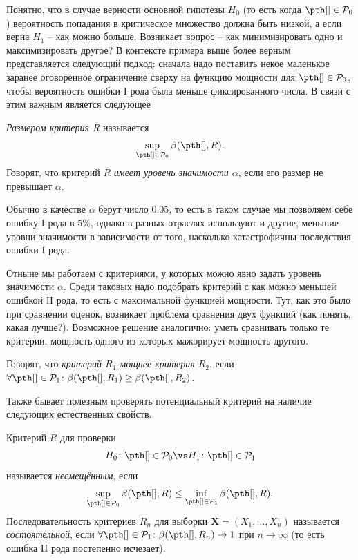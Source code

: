Понятно, что в случае верности основной гипотезы $H_0$ (то есть когда $\pth[] \in \mathcal{P}_0$) вероятность попадания в критическое множество должна быть низкой, а если верна $H_1$ -- как можно больше. Возникает вопрос -- как минимизировать одно и максимизировать другое? В контексте примера выше более верным представляется следующий подход: сначала надо поставить некое маленькое заранее оговоренное ограничение сверху на функцию мощности для $\pth[] \in \mathcal{P}_0$, чтобы вероятность ошибки I рода была меньше фиксированного числа. В связи с этим важным является следующее
\begin{definition}
\textit{Размером критерия R} называется
\[
\sup_{\pth[] \in \mathcal{P}_0} \beta(\pth[], R).
\]
Говорят, что критерий $R$ \textit{имеет уровень значимости $\alpha$}, если его размер не превышает $\alpha$.
\end{definition}

Обычно в качестве $\alpha$ берут число 0.05, то есть в таком случае мы позволяем себе ошибку I рода в $5\%$, однако в разных отраслях используют и другие, меньшие уровни значимости в зависимости от того, насколько катастрофичны последствия ошибки I рода.

Отныне мы работаем с критериями, у которых можно явно задать уровень значимости $\alpha$. Среди таковых надо подобрать критерий с как можно меньшей ошибкой II рода, то есть с максимальной функцией мощности. Тут, как это было при сравнении оценок, возникает проблема сравнения двух функций (как понять, какая лучше?). Возможное решение аналогично: уметь сравнивать только те критерии, мощность одного из которых мажорирует мощность другого.

\begin{definition}
Говорят, что \textit{критерий $R_1$ мощнее критерия $R_2$}, если $\forall \pth[] \in \mathcal{P}_1\colon \beta(\pth[], R_1) \ge \beta(\pth[], R_2)$.
\end{definition}

Также бывает полезным проверять потенциальный критерий на наличие следующих естественных свойств.
\begin{definition}
Критерий $R$ для проверки
\[
H_0\colon \pth[] \in \mathcal{P}_0 \vs H_1\colon \pth[] \in \mathcal{P}_1
\]
называется \textit{несмещённым}, если
\[
\sup_{\pth[] \in \mathcal{P}_0} \beta(\pth[], R) \le \inf_{\pth[] \in \mathcal{P}_1} \beta(\pth[], R).
\]
Последовательность критериев $R_n$ для выборки $\mathbf X = (X_1, \ldots, X_n)$ называется \textit{состоятельной}, если $\forall \pth[] \in \mathcal{P}_1\colon \beta(\pth[], R_n) \to 1$ при $n \to \infty$ (то есть ошибка II рода постепенно исчезает).
\end{definition}

